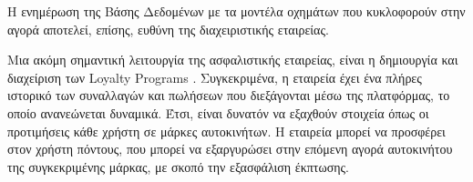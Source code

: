 \documentclass{../ol-softwaremanual}
\begin{document}
	Η ενημέρωση της Βάσης Δεδομένων με τα μοντέλα οχημάτων που κυκλοφορούν στην αγορά αποτελεί, επίσης, ευθύνη της διαχειριστικής εταιρείας. \break
	
	Μια ακόμη σημαντική λειτουργία της ασφαλιστικής εταιρείας, είναι η δημιουργία και διαχείριση των \en Loyalty Programs \gr. Συγκεκριμένα, η εταιρεία έχει ένα πλήρες ιστορικό των συναλλαγών και πωλήσεων που διεξάγονται μέσω της πλατφόρμας, το οποίο ανανεώνεται δυναμικά. Έτσι, είναι δυνατόν να εξαχθούν στοιχεία όπως οι προτιμήσεις κάθε χρήστη σε μάρκες αυτοκινήτων. Η εταιρεία μπορεί να προσφέρει στον χρήστη πόντους, που μπορεί να εξαργυρώσει στην επόμενη αγορά αυτοκινήτου της συγκεκριμένης μάρκας, με σκοπό την εξασφάλιση έκπτωσης. \break 
	
	
	
	\newpage
	
	 \gr
	
\end{document}

